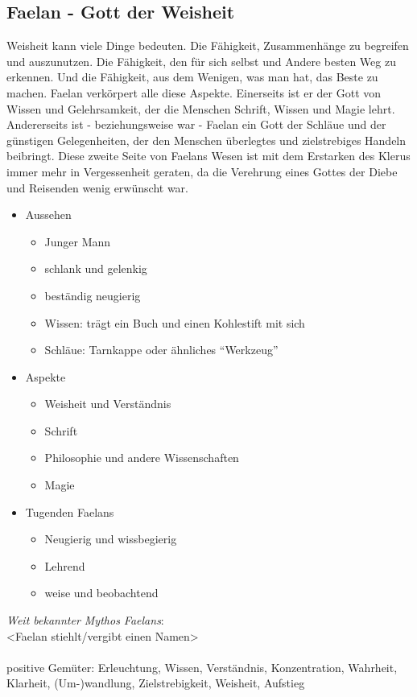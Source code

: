 \subsection{\textbf{Faelan} - Gott der Weisheit}
Weisheit kann viele Dinge bedeuten. Die Fähigkeit, Zusammenhänge zu begreifen und auszunutzen. Die Fähigkeit, den für sich selbst und Andere besten Weg zu erkennen. Und die 
Fähigkeit, aus dem Wenigen, was man hat, das Beste zu machen. Faelan verkörpert alle diese Aspekte. Einerseits ist er der Gott von Wissen und 
Gelehrsamkeit, der die Menschen Schrift, Wissen und Magie lehrt. Andererseits ist - beziehungsweise war - Faelan ein Gott der Schläue und 
der günstigen Gelegenheiten, der den Menschen überlegtes und zielstrebiges Handeln beibringt. Diese zweite Seite von Faelans Wesen ist mit 
dem Erstarken des Klerus immer mehr in Vergessenheit geraten, da die Verehrung eines Gottes der Diebe und Reisenden wenig erwünscht war.\\
\begin{itemize}
	\item Aussehen 
	\begin{itemize}
		\item Junger Mann 
		\item schlank und gelenkig
		\item beständig neugierig
		\item Wissen: trägt ein Buch und einen Kohlestift mit sich
		\item Schläue: Tarnkappe oder ähnliches ``Werkzeug''
	\end{itemize}
	\item Aspekte
	\begin{itemize}
		\item Weisheit und Verständnis
		\item Schrift
		\item Philosophie und andere Wissenschaften
		\item Magie
	\end{itemize}
	\item Tugenden Faelans
	\begin{itemize}
		\item Neugierig und wissbegierig
		\item Lehrend
		\item weise und beobachtend
	\end{itemize}
\end{itemize}
\textit{Weit bekannter Mythos Faelans}:\\
<Faelan stiehlt/vergibt einen Namen>  \\~\\
positive Gemüter: Erleuchtung, Wissen, Verständnis, Konzentration, Wahrheit, Klarheit, (Um-)wandlung, Zielstrebigkeit, Weisheit, Aufstieg


